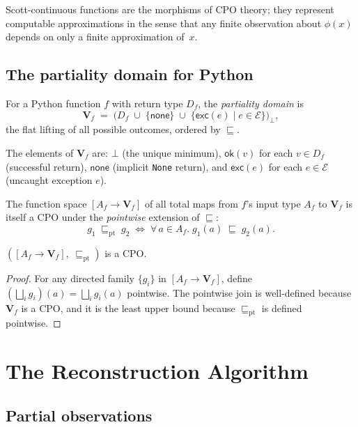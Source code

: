 \documentclass[11pt]{article}
\newcommand{\LiftD}[1]{#1_{\bot}}           %
\newcommand{\Apx}{\sqsubseteq}              %
\newcommand{\Lub}{\bigsqcup}               %
\newcommand{\POK}[1]{\mathsf{ok}(#1)}      %
\newcommand{\PNone}{\mathsf{none}}          %
\newcommand{\PExc}[1]{\mathsf{exc}(#1)}    %
\newcommand{\PVal}{\mathbf{V}}             %
\newcommand{\ExcH}{\mathcal{E}}            %
\begin{document}
Scott-continuous functions are the morphisms of CPO theory; they
represent computable approximations in the sense that any finite
observation about $\phi(x)$ depends on only a finite approximation
of~$x$.

\subsection{The partiality domain for Python}

\begin{definition}\label{def:pval}
For a Python function $f$ with return type $D_f$, the
\emph{partiality domain} is
\[
  \PVal_f
  \;=\;
  \LiftD{\bigl(D_f
    \;\cup\; \{\PNone\}
    \;\cup\; \{\PExc{e} \mid e \in \ExcH\}
  \bigr)},
\]
the flat lifting of all possible outcomes, ordered by $\Apx$.
\end{definition}

The elements of $\PVal_f$ are: $\bot$ (the unique minimum), $\POK{v}$
for each $v \in D_f$ (successful return), $\PNone$ (implicit
\texttt{None} return), and $\PExc{e}$ for each $e \in \ExcH$ (uncaught
exception $e$).

The function space $[A_f \to \PVal_f]$ of all total maps from $f$'s
input type $A_f$ to $\PVal_f$ is itself a CPO under the
\emph{pointwise} extension of $\Apx$:
\[
  g_1 \;\Apx_\mathrm{pt}\; g_2
  \;\iff\;
  \forall\, a \in A_f.\; g_1(a) \;\Apx\; g_2(a).
\]

\begin{proposition}\label{prop:ptwise-cpo}
$([A_f \to \PVal_f],\; \Apx_\mathrm{pt})$ is a CPO.
\end{proposition}

\begin{proof}
For any directed family $\{g_i\}$ in $[A_f \to \PVal_f]$, define
$(\Lub_i g_i)(a) = \Lub_i g_i(a)$ pointwise.  The pointwise join is
well-defined because $\PVal_f$ is a CPO, and it is the least upper
bound because $\Apx_\mathrm{pt}$ is defined pointwise.
\end{proof}

\section{The Reconstruction Algorithm}\label{sec:algorithm}

\subsection{Partial observations}
\end{document}
